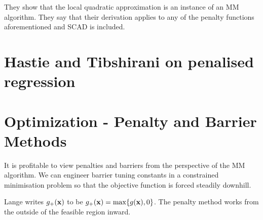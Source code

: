 \documentclass{article}
\newcommand{\bx}{{\bf{x}}}                                                 %
\begin{document}
They show that the local quadratic approximation is an instance of an MM algorithm. They say that their derivation applies to any of the penalty functions aforementioned and SCAD is included.  

\section{Hastie and Tibshirani on penalised regression \citet{hastie2009elements}}

\section{Optimization - Penalty and Barrier Methods \citet{lange2000optimization}}

It is profitable to view penalties and barriers from the perspective of the MM algorithm. We can engineer barrier tuning constants in a constrained
minimisation problem so that the objective function is forced steadily downhill. 

Lange writes $g_+(\bx)$ to be $g_+(\bx) = \max\{g(\bx), 0\}$. The penalty method works from the outside of the feasible region inward. 

















\clearpage



\end{document}
